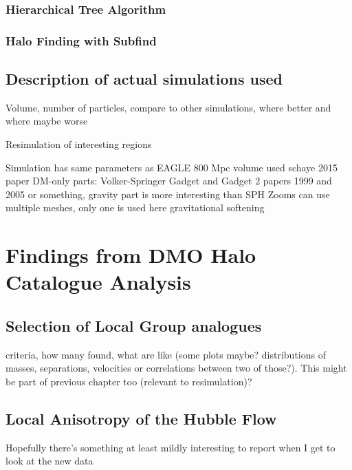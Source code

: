 \documentclass[english, oneside]{HYgradu}
\begin{document}
\subsection{Hierarchical Tree Algorithm}
\subsection{Halo Finding with Subfind} %

\section{Description of actual simulations used}
Volume, number of particles, compare to other simulations, where better and where maybe worse

Resimulation of interesting regions

Simulation has same parameters as EAGLE
800 Mpc volume used
schaye 2015 paper
DM-only parts: Volker-Springer Gadget and Gadget 2 papers 1999 and 2005 or something,     gravity part is more interesting than SPH 
Zooms can use multiple meshes, only one is used here
gravitational softening

\chapter{Findings from DMO Halo Catalogue Analysis}
\section{Selection of Local Group analogues}
criteria, how many found, what are like (some plots maybe? distributions of masses, separations, velocities or correlations between two of those?). This might be part of previous chapter too (relevant to resimulation)?

\section{Local Anisotropy of the Hubble Flow}
Hopefully there's something at least mildly interesting to report when I get to look at the new data

\end{document}
